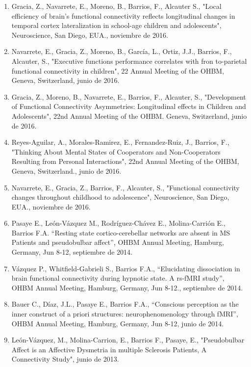 \begin{enumerate}
\item  Gracia, Z., Navarrete, E., Moreno, B., Barrios, F., Alcauter S., "Local efficiency of brain's functional connectivity 
reflects longitudinal changes in temporal cortex lateralization in school-age children and adolescents", Neuroscience, San 
Diego, EUA., noviembre de 2016.

\item  Navarrete, E., Gracia, Z., Moreno, B., García, L., Ortiz, J.J., Barrios, F., Alcauter, S., "Executive functions 
performance correlates with fron to-parietal functional connectivity in children", 22 Annual Meeting of the OHBM, Geneva, 
Switzerland, junio de 2016.

\item  Gracia, Z., Moreno, B., Navarrete, E., Barrios, F., Alcauter, S., "Development of Functional Connectivity Asymmetries: 
Longitudinal effects in Children and Adolescents", 22nd Annual Meeting of the OHBM. Geneva, Switzerland, junio de 2016.

\item  Reyes-Aguilar, A., Morales-Ramirez, E., Fernandez-Ruiz, J., Barrios, F., "Thinking About Mental States of Cooperators 
and 
Non-Cooperators Resulting from Personal Interactions", 22nd Annual Meeting of the OHBM, Geneva, Switzerland., junio de 2016.

\item  Navarrete, E., Gracia, Z., Barrios, F., Alcauter, S., "Functional connectivity changes throughout childhood to 
adolescence", Neuroscience, San Diego, EUA., noviembre de 2016.

\item  Pasaye E., León-Vázquez M., Rodríguez-Chávez E., Molina-Carrión E., Barrios F.A. “Resting state cortico-cerebellar 
networks are absent in MS Patients and pseudobulbar affect”, OHBM Annual Meeting, Hamburg, Germany, Jun 8-12, septiembre de 2014.

\item  Vázquez P., Whitfield-Gabrieli S., Barrios F.A., “Elucidating dissociation in brain functional connectivity during 
hypnotic state. A rs-fMRI study”, OHBM Annual Meeting, Hamburg, Germany, Jun 8-12., 
septiembre de 2014.

\item  Bauer C., Díaz, J.L., Pasaye E., Barrios F.A., “Conscious perception as the inner construct of a priori structures: 
neurophenomenology through fMRI”, OHBM Annual Meeting, Hamburg, Germany, Jun 8-12, junio 
de 2014.

\item  León-Vázquez, M., Molina-Carrion, E., Barrios F., Pasaye, E., "Pseudobulbar Affect is an Affective Dysmetria in 
multiple 
Sclerosis Patients, A Connectivity Study", junio de 2013.


\end{enumerate}
